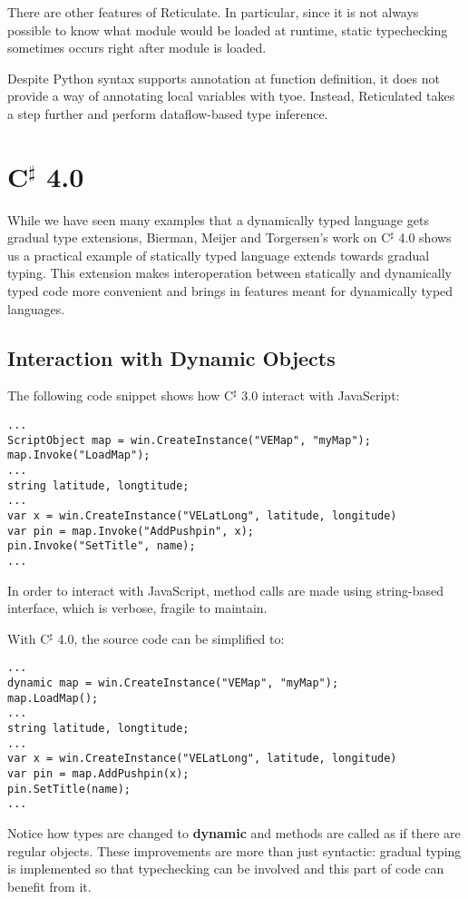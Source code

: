 There are other features of Reticulate.
In particular, since it is not always possible to know what module would be loaded
at runtime, static typechecking sometimes occurs right after module is loaded.

Despite Python syntax supports annotation at function definition,
it does not provide a way of annotating local variables with tyoe.
Instead, Reticulated takes a step further and perform dataflow-based type inference.

\section{C$^\sharp$ 4.0}

While we have seen many examples that a dynamically typed language gets
gradual type extensions, Bierman, Meijer and Torgersen's work on
C$^\sharp$ 4.0 shows us a practical example of statically typed language
extends towards gradual typing.
This extension makes interoperation between statically and dynamically typed code
more convenient and brings in features meant for dynamically typed languages.

\subsection{Interaction with Dynamic Objects}

The following code snippet shows how C$^\sharp$ 3.0 interact with JavaScript:

\begin{verbatim}
...
ScriptObject map = win.CreateInstance("VEMap", "myMap");
map.Invoke("LoadMap");
...
string latitude, longtitude;
...
var x = win.CreateInstance("VELatLong", latitude, longitude)
var pin = map.Invoke("AddPushpin", x);
pin.Invoke("SetTitle", name);
...
\end{verbatim}

In order to interact with JavaScript, method calls
are made using string-based interface, which is verbose, fragile to maintain.

With C$^\sharp$ 4.0, the source code can be simplified to:

\begin{verbatim}
...
dynamic map = win.CreateInstance("VEMap", "myMap");
map.LoadMap();
...
string latitude, longtitude;
...
var x = win.CreateInstance("VELatLong", latitude, longitude)
var pin = map.AddPushpin(x);
pin.SetTitle(name);
...
\end{verbatim}

Notice how types are changed to \textbf{dynamic} and methods are called
as if there are regular objects.
These improvements are more than just syntactic: gradual typing is implemented
so that typechecking can be involved and this part of code can benefit from it.

